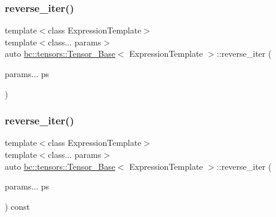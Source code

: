 \subsubsection{\texorpdfstring{reverse\+\_\+iter()}{reverse\_iter()}\hspace{0.1cm}{\footnotesize\ttfamily [1/2]}}
{\footnotesize\ttfamily template$<$class Expression\+Template$>$ \\
template$<$class... params$>$ \\
auto \hyperlink{classbc_1_1tensors_1_1Tensor__Base}{bc\+::tensors\+::\+Tensor\+\_\+\+Base}$<$ Expression\+Template $>$\+::reverse\+\_\+iter (\begin{DoxyParamCaption}\item[{params...}]{ps }\end{DoxyParamCaption})\hspace{0.3cm}{\ttfamily [inline]}}

\mbox{\label{classbc_1_1tensors_1_1Tensor__Base_aca9fe3360591d4220c579120e1d3bb2f}} 
\subsubsection{\texorpdfstring{reverse\+\_\+iter()}{reverse\_iter()}\hspace{0.1cm}{\footnotesize\ttfamily [2/2]}}
{\footnotesize\ttfamily template$<$class Expression\+Template$>$ \\
template$<$class... params$>$ \\
auto \hyperlink{classbc_1_1tensors_1_1Tensor__Base}{bc\+::tensors\+::\+Tensor\+\_\+\+Base}$<$ Expression\+Template $>$\+::reverse\+\_\+iter (\begin{DoxyParamCaption}\item[{params...}]{ps }\end{DoxyParamCaption}) const\hspace{0.3cm}{\ttfamily [inline]}}

\mbox{\label{classbc_1_1tensors_1_1Tensor__Base_a49aec3b38b0206c5a738ffbfd1fd1777}} 
